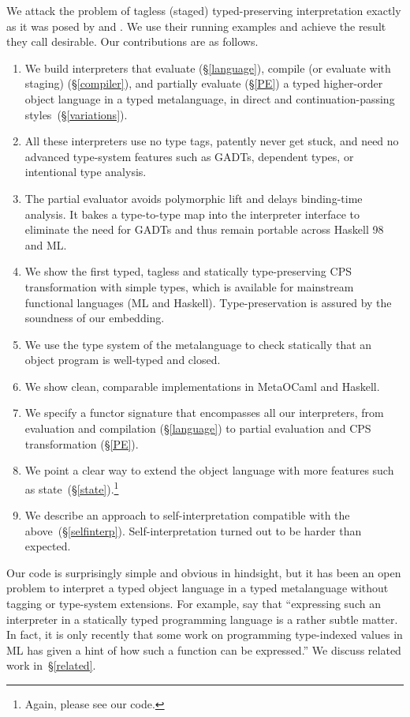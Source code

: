 We attack the problem of tagless (staged) typed-preserving
interpretation exactly as it was posed
by \citet{WalidICFP02} and \citet{xi-guarded}.
We use their running examples and achieve the
result they call desirable.  Our contributions are as follows.

\begin{enumerate}
\item We build interpreters that evaluate (\S\ref{language}),
    compile (or evaluate with staging) (\S\ref{compiler}), and partially evaluate (\S\ref{PE}) a typed higher-order object language
   in a typed metalanguage, in direct and continuation\hyp passing
   styles\ifshort\else\ (\S\ref{variations})\fi.
\item All these interpreters use no type tags, patently never get stuck,
    and need no advanced type-system features such as GADTs, dependent types,
    or intentional type analysis.
\item The partial evaluator avoids polymorphic lift and delays binding-time
    analysis.  It bakes a type-to-type map into the interpreter
    interface to eliminate the need for GADTs and thus remain portable
    across Haskell 98 and ML.
\item We show the first typed, tagless and statically type-preserving CPS
    transformation with simple types, which is available for mainstream
    functional languages (ML and Haskell). Type-preservation is assured by
    the soundness of our embedding.
\item We use the type system of the metalanguage
    to check statically that an object program is well-typed and closed.
\item We show clean, comparable implementations in MetaOCaml and Haskell.
\item We specify a functor signature that encompasses all our
  interpreters, from evaluation and compilation (\S\ref{language}) 
   to partial evaluation \ifshort\else and CPS transformation \fi(\S\ref{PE}).
\item We point a clear way to extend the object language with more features
    such as state\ifshort\else~(\S\ref{state})\fi.\ifshort\footnote{Again, please see our code.}\fi
\item We describe an approach to self\hyp interpretation compatible with the
  above\ifshort\else~(\S\ref{selfinterp})\fi.  Self\hyp interpretation turned
  out to be harder than expected.\ifshort\footnotemark[\value{footnote}]\fi
\end{enumerate}
Our code is surprisingly simple and obvious in hindsight, but
it has been an open problem to
interpret a typed object language in a typed metalanguage without
tagging or type\hyp system extensions.  For example, \citet{taha-tag}
say that ``expressing such an interpreter in a statically typed
programming language is a rather subtle matter. In fact, it is only
recently that some work on programming type-indexed values in ML
\cite{yang-encoding} has given a hint of how such a function can be
expressed.''  We discuss related work in~\S\ref{related}.

